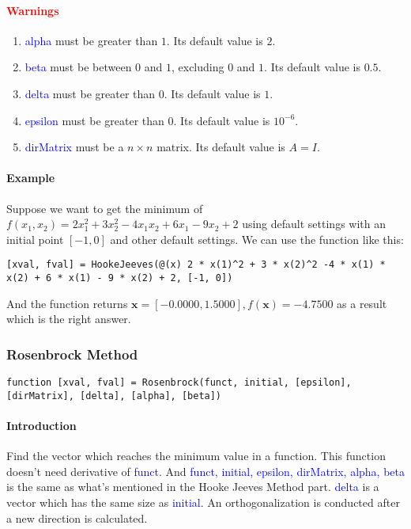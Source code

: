 \documentclass{article}
\begin{document}
\paragraph{\textcolor{red}{Warnings}}
\begin{enumerate}
    \item \textcolor{blue}{alpha} must be greater than $1$. Its default value is $2$.
    \item \textcolor{blue}{beta} must be between $0$ and $1$, excluding $0$ and $1$. Its default value is $0.5$.
    \item \textcolor{blue}{delta} must be greater than 0. Its default value is $1$.
    \item \textcolor{blue}{epsilon} must be greater than $0$. Its default value is $10^{-6}$.
    \item \textcolor{blue}{dirMatrix} must be a $n \times n$ matrix. Its default value is $A = I$.
\end{enumerate}

\paragraph{Example}
Suppose we want to get the minimum of $f(x_1, x_2) = 2 x_1^2 + 3 x_2^2 - 4 x_1 x_2 + 6 x_1 - 9 x_2 + 2$ using default settings with an initial point $[-1, 0]$ and other default settings. We can use the function like this:
\begin{verbatim}
[xval, fval] = HookeJeeves(@(x) 2 * x(1)^2 + 3 * x(2)^2 -4 * x(1) * x(2) + 6 * x(1) - 9 * x(2) + 2, [-1, 0])
\end{verbatim}

And the function returns $\mathbf{x} = [-0.0000, 1.5000], f(\mathbf{x}) = -4.7500$ as a result which is the right answer.

\subsubsection{Rosenbrock Method}
\begin{verbatim}
function [xval, fval] = Rosenbrock(funct, initial, [epsilon], [dirMatrix], [delta], [alpha], [beta])    
\end{verbatim}

\paragraph{Introduction}
Find the vector which reaches the minimum value in a function. This function doesn't need derivative of \textcolor{blue}{funct}. And \textcolor{blue}{funct, initial, epsilon, dirMatrix, alpha, beta} is the same as what's mentioned in the Hooke Jeeves Method part. \textcolor{blue}{delta} is a vector which has the same size as \textcolor{blue}{initial}. An orthogonalization is conducted after a new direction is calculated. 
\end{document}
